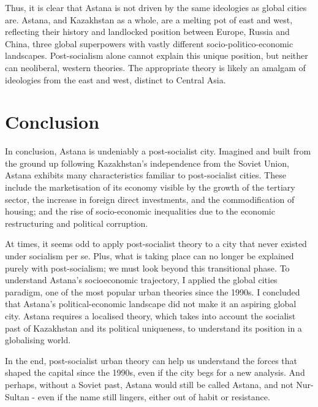 \documentclass{article}
\begin{document}
Thus, it is clear that Astana is not driven by the same ideologies as global cities are. Astana, and Kazakhstan as a whole, are a melting pot of east and west, reflecting their history and landlocked position between Europe, Russia and China, three global superpowers with vastly different socio-politico-economic landscapes. Post-socialism alone cannot explain this unique position, but neither can neoliberal, western theories. The appropriate theory is likely an amalgam of ideologies from the east and west, distinct to Central Asia.

\section{Conclusion}

In conclusion, Astana is undeniably a post-socialist city. Imagined and built from the ground up following Kazakhstan's independence from the Soviet Union, Astana exhibits many characteristics familiar to post-socialist cities. These include the marketisation of its economy visible by the growth of the tertiary sector, the increase in foreign direct investments, and the commodification of housing; and the rise of socio-economic inequalities due to the economic restructuring and political corruption.

At times, it seems odd to apply post-socialist theory to a city that never existed under socialism per se. Plus, what is taking place can no longer be explained purely with post-socialism; we must look beyond this transitional phase.
To understand Astana's socioeconomic trajectory, I applied the global cities paradigm, one of the most popular urban theories since the 1990s. I concluded that Astana's political-economic landscape did not make it an aspiring global city.
 Astana requires a localised theory, which takes into account the socialist past of Kazakhstan and its political uniqueness, to understand its position in a globalising world.


In the end, post-socialist urban theory can help us understand the forces that shaped the capital since the 1990s, even if the city begs for a new analysis.
And perhaps, without a Soviet past, Astana would still be called Astana, and not Nur-Sultan - even if the name still lingers, either out of habit or resistance.

\end{document}
